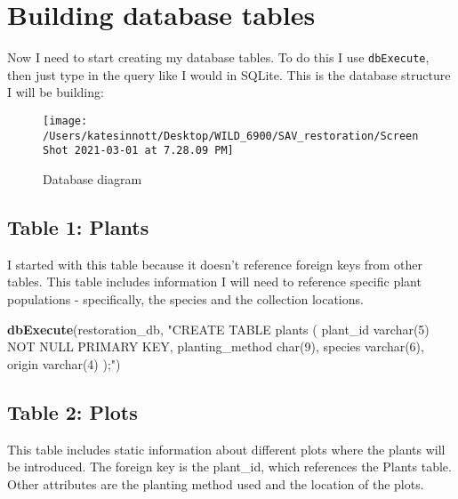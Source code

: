 \documentclass[
]{book}
\newenvironment{Shaded}{\begin{snugshade}}{\end{snugshade}}
\newcommand{\KeywordTok}[1]{\textcolor[rgb]{0.13,0.29,0.53}{\textbf{#1}}}
\newcommand{\NormalTok}[1]{#1}
\newcommand{\StringTok}[1]{\textcolor[rgb]{0.31,0.60,0.02}{#1}}
\begin{document}
\hypertarget{building-database-tables}{%
\section{Building database tables}\label{building-database-tables}}

Now I need to start creating my database tables. To do this I use \texttt{dbExecute}, then
just type in the query like I would in SQLite. This is the database structure I will
be building:

\begin{figure}

{\centering \texttt{[image: /Users/katesinnott/Desktop/WILD\_6900/SAV\_restoration/Screen Shot 2021-03-01 at 7.28.09 PM]} 

}

\caption{Database diagram}\label{fig:diagram}
\end{figure}

\hypertarget{table-1-plants}{%
\subsection{Table 1: Plants}\label{table-1-plants}}

I started with this table because it doesn't reference foreign keys from other tables. This table includes information I will need to reference specific plant populations -
specifically, the species and the collection locations.

\begin{Shaded}
\begin{Highlighting}[]
\KeywordTok{dbExecute}\NormalTok{(restoration_db, }\StringTok{"CREATE TABLE plants (}
\StringTok{          plant_id varchar(5) NOT NULL PRIMARY KEY,}
\StringTok{          planting_method char(9),}
\StringTok{          species varchar(6),}
\StringTok{          origin varchar(4)}
\StringTok{          );"}\NormalTok{)}
\end{Highlighting}
\end{Shaded}

\hypertarget{table-2-plots}{%
\subsection{Table 2: Plots}\label{table-2-plots}}

This table includes static information about different plots where the plants will be introduced. The foreign key is the plant\_id, which references the Plants table. Other attributes are the planting method used and the location of the plots.
\end{document}
